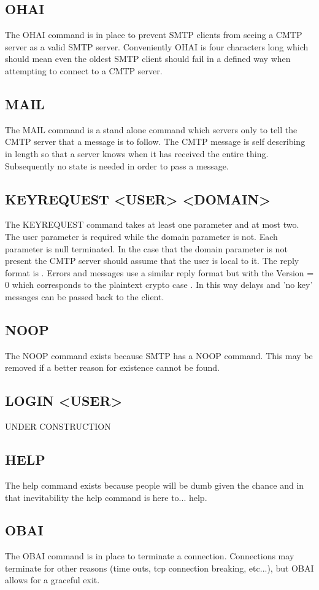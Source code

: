 \documentclass[a4paper,11pt]{article}
\begin{document}
\subsection{OHAI}
The OHAI command is in place to prevent SMTP clients from seeing a CMTP server as a valid SMTP server. Conveniently OHAI is four characters long which should mean even the oldest SMTP client should fail in a defined way when attempting to connect to a CMTP server.
\subsection{MAIL}
The MAIL command is a stand alone command which servers only to tell the CMTP server that a message is to follow. The CMTP message is self describing in length so that a server knows when it has received the entire thing. Subsequently no state is needed in order to pass a message.
\subsection{KEYREQUEST <USER> <DOMAIN>}
The KEYREQUEST command takes at least one parameter and at most two. The user parameter is required while the domain parameter is not. Each parameter is null terminated. In the case that the domain parameter is not present the CMTP server should assume that the user is local to it. The reply format is \newline
[Version][UserPublicKey][ServerSigOfKey][\textbackslash 0]. \newline
Errors and messages use a similar reply format but with the Version = 0 which corresponds to the plaintext crypto case \newline
[Version][Message][ServerSigOfMessage][\textbackslash 0]. \newline
In this way delays and 'no key' messages can be passed back to the client.
\subsection{NOOP}
The NOOP command exists because SMTP has a NOOP command. This may be removed if a better reason for existence cannot be found.
\subsection{LOGIN <USER>}
UNDER CONSTRUCTION
\subsection{HELP}
The help command exists because people will be dumb given the chance and in that inevitability the help command is here to... help.
\subsection{OBAI}
The OBAI command is in place to terminate a connection. Connections may terminate for other reasons (time outs, tcp connection breaking, etc...), but OBAI allows for a graceful exit. 
\end{document}
